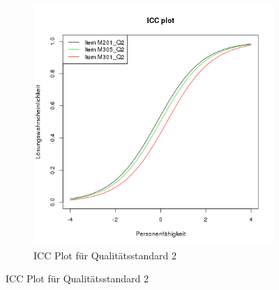 \begin{figure}[htp]
\begin{subfigure}{0.49\textwidth}
   \includegraphics[width=1.0\linewidth]{graphics/ICCQ2.png}
   \caption{ICC Plot für Qualitätsstandard 2}
   \label{fig:ICCQ2}
 \end{subfigure}
 \end{figure}
